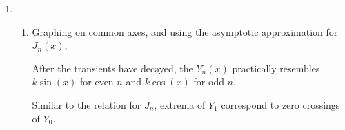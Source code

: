 \begin{enumerate}
    \item
          \begin{enumerate}
              \item Graphing on common axes, and using the asymptotic approximation for
                    $ J_n(x) $,
                    \begin{figure}[H]
                        \centering
                    \end{figure}
                    After the transients have decayed, the $ Y_n(x) $ practically
                    resembles $ k\sin(x) $ for even $ n $ and $ k\cos(x) $ for odd $ n $.
                    \par
                    Similar to the relation for $ J_n $, extrema of $ Y_1 $ correspond to
                    zero crossings of $ Y_0 $.


\end{enumerate}
\end{enumerate}
